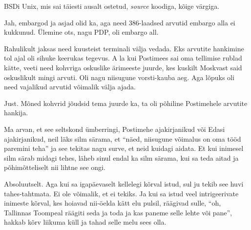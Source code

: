
BSDi Unix, mis sai täiesti ausalt ostetud, \emph{source} 
koodiga,  kõige värgiga. 


Jah, embargod ja asjad olid ka, aga need 386-laadsed arvutid embargo alla ei 
kukkunud. Ülemine ots, nagu PDP, oli embargo all. 

Rahulikult jaksas need kuusteist terminali välja vedada. Eks arvutite hankimine 
tol ajal oli  sihuke keerukas tegevus. A la kui  Postimees sai oma tellimise 
rublad kätte,  veeti need kohvriga oskuslike ärimeeste juurde, kes kuskilt 
Moskvast said oskuslikult mingi arvuti. Oli nagu niisugune vorsti-kauba aeg. 
Aga lõpuks oli need vajalikud arvutid võimalik välja ajada.


Just. Mõned kohvrid jõudsid tema juurde ka, ta oli põhiline Postimehele 
arvutite hankija.


Ma arvan, et  see seltskond ümberringi, Postimehe ajakirjanikud või Edasi 
ajakirjanikud, neil läks silm särama, et \enquote{näed, niisugune võimalus on  
oma tööd paremini teha} ja see tekitas nagu surve, et neid kuidagi aidata. Et 
kui inimesel silm särab midagi tehes, läheb sinul endal ka silm särama, kui sa 
teda aitad ja põhimõtteliselt nii lihtne see ongi.


Absoluutselt. Aga kui sa igapäevaselt kellelegi kõrval istud, sul ju tekib see 
huvi tahes-tahtmata. Ei ole võimalik, et ei tekiks. Ja kui sa istud veel 
intrigeerivate inimeste kõrval, kes hoiavad nii-öelda  kätt elu pulsil, 
räägivad sulle, \enquote{oh,  Tallinnas Toompeal räägiti seda ja toda ja kas 
paneme selle lehte või pane}, hakkab kõrv liikuma küll ja tahad selle  melu 
sees olla.


